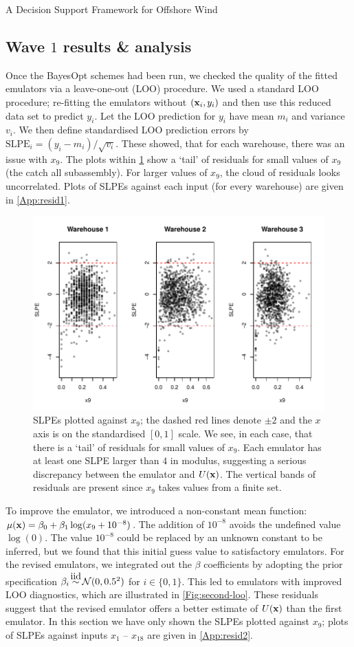 \begin{chapter}{A Decision Support Framework for Offshore Wind \label{Ch:ds-for-ow}}
\subsection{Wave $1$ results \& analysis}
Once the BayesOpt schemes had been run, we checked the quality of the fitted emulators via a leave-one-out (LOO) procedure. We used a standard LOO procedure; re-fitting the emulators without $(\mathbf{x}_i, y_i)$ and then use this reduced data set to predict $y_i$. Let the LOO prediction for $y_i$ have mean $m_i$ and variance $v_i$. We then define standardised LOO prediction errors by $\text{SLPE}_i = (y_i - m_i)/\sqrt{v_i}$. These showed, that for each warehouse, there was an issue with $x_9$. The plots within \cref{Fig:first-loo} show a `tail' of residuals for small values of $x_9$ (the catch all subassembly). For larger values of $x_9$, the cloud of residuals looks uncorrelated. Plots of SLPEs against each input (for every warehouse) are given in \cref{App:resid1}.
\begin{figure}
 \centering
 \includegraphics{fig-ds/first-resids.pdf}
 \caption{SLPEs plotted against $x_9$; the dashed red lines denote $\pm 2$ and the $x$ axis is on the standardised $[0,1]$ scale. We see, in each case, that there is a `tail' of residuals for small values of $x_9$. Each emulator has at least one SLPE larger than $4$ in modulus, suggesting a serious discrepancy between the emulator and $U(\mathbf{x})$. The vertical bands of residuals are present since $x_9$ takes values from a finite set. \label{Fig:first-loo}}
\end{figure}
To improve the emulator, we introduced a non-constant mean function: $\mu(\mathbf{x}) = \beta_0 + \beta_1 \log (x_9 + 10^{-8})$. The addition of $10^{-8}$ avoids the undefined value $\log(0)$. The value $10^{-8}$ could be replaced by an unknown constant to be inferred, but we found that this initial guess value to satisfactory emulators. For the revised emulators, we integrated out the $\beta$ coefficients by adopting the prior specification $\beta_i \iid \mathcal{N}(0, 0.5^2)$ for $i \in \{0, 1\}$. This led to emulators with improved LOO diagnostics, which are illustrated in \cref{Fig:second-loo}. These residuals suggest that the revised emulator offers a better estimate of $U(\mathbf{x})$ than the first emulator. In this section we have only shown the SLPEs plotted against $x_9$; plots of SLPEs against inputs $x_1$ -- $x_{18}$ are given in \cref{App:resid2}.

\end{chapter}

